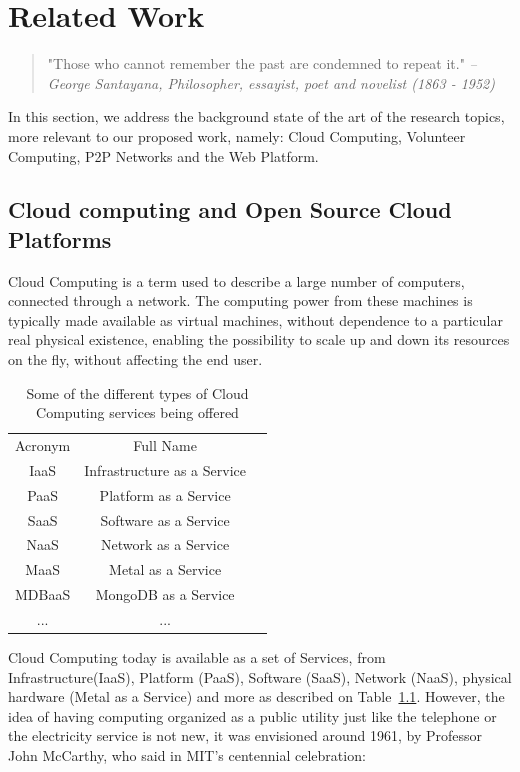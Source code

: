 \chapter{Related Work}\label{ch:relatedwork}

\begin{quotation}
    "Those who cannot remember the past are condemned to repeat it."
    {\small\it -- George Santayana, Philosopher, essayist, poet and novelist (1863 - 1952)}
\end{quotation}

In this section, we address the background state of the art of the research topics, more relevant to our proposed work, namely: Cloud Computing, Volunteer Computing, P2P Networks and the Web Platform.

% 
% 
\section{Cloud computing and Open Source Cloud Platforms}

Cloud Computing is a term used to describe a large number of computers, connected through a network. The computing power from these machines is typically made available as virtual machines, without dependence to a particular real physical existence, enabling the possibility to scale up and down its resources on the fly, without affecting the end user.

\begin{table}
  \centering
  \begin{tabular}{| c | c | c |}
  \hline 
  Acronym & Full Name  \\
  IaaS & Infrastructure as a Service \\
  PaaS & Platform as a Service \\
  SaaS & Software as a Service \\
  NaaS & Network as a Service \\
  MaaS & Metal as a Service \\
  MDBaaS & MongoDB as a Service \\
  ... & ... \\
  \hline   
  \end{tabular}
  \caption{Some of the different types of Cloud Computing services being offered}
  \label{tbl:aastypes}
\end{table}

Cloud Computing today is available as a set of Services, from Infrastructure(IaaS), Platform (PaaS), Software (SaaS), Network (NaaS), physical hardware (Metal as a Service) and more as described on Table~\ref{tbl:aastypes}. However, the idea of having computing organized as a public utility just like the telephone or the electricity service is not new, it was envisioned around 1961, by Professor John McCarthy, who said in MIT's centennial celebration:

